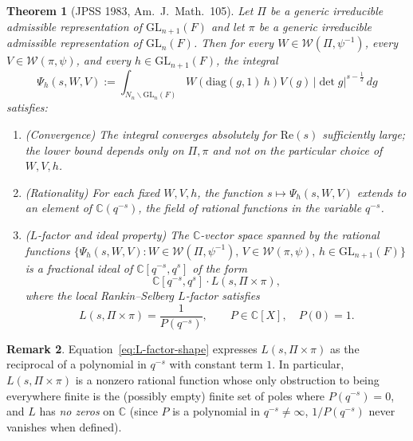 \documentclass[12pt]{article}
\newtheorem{theorem}{Theorem}
\theoremstyle{definition}
\newtheorem{remark}[theorem]{Remark}
\begin{document}
\begin{theorem}[JPSS 1983, Am.\ J.\ Math.\ 105]\label{thm:JPSS-RS}
Let $\Pi$ be a generic irreducible admissible representation of $\mathrm{GL}_{n+1}(F)$ and let $\pi$ be a generic irreducible admissible representation of $\mathrm{GL}_n(F)$. Then for every $W\in\mathcal{W}(\Pi,\psi^{-1})$, every $V\in\mathcal{W}(\pi,\psi)$, and every $h\in\mathrm{GL}_{n+1}(F)$, the integral
\begin{equation}\label{eq:Psi-h}
\Psi_h(s,W,V):=\int_{N_n\backslash\mathrm{GL}_n(F)}W\!\left(\mathrm{diag}(g,1)\,h\right)V(g)\,|\det g|^{s-\tfrac12}\,dg
\end{equation}
satisfies:
\begin{enumerate}
\item[\textup{(i)}] (\emph{Convergence}) The integral converges absolutely for $\mathrm{Re}(s)$ sufficiently large; the lower bound depends only on $\Pi,\pi$ and not on the particular choice of $W,V,h$.
\item[\textup{(ii)}] (\emph{Rationality}) For each fixed $W,V,h$, the function $s\mapsto\Psi_h(s,W,V)$ extends to an element of $\mathbb{C}(q^{-s})$, the field of rational functions in the variable $q^{-s}$.
\item[\textup{(iii)}] (\emph{$L$-factor and ideal property}) The $\mathbb{C}$-vector space spanned by the rational functions $\{\Psi_h(s,W,V):W\in\mathcal{W}(\Pi,\psi^{-1}),\,V\in\mathcal{W}(\pi,\psi),\,h\in\mathrm{GL}_{n+1}(F)\}$ is a fractional ideal of $\mathbb{C}[q^{-s},q^s]$ of the form
\begin{equation}\label{eq:fractional-ideal}
\mathbb{C}[q^{-s},q^s]\cdot L(s,\Pi\times\pi),
\end{equation}
where the local Rankin--Selberg $L$-factor satisfies
\begin{equation}\label{eq:L-factor-shape}
L(s,\Pi\times\pi)=\frac{1}{P(q^{-s})},\qquad P\in\mathbb{C}[X],\quad P(0)=1.
\end{equation}
\end{enumerate}
\end{theorem}

\begin{remark}\label{rem:L-no-zeros}
Equation~\eqref{eq:L-factor-shape} expresses $L(s,\Pi\times\pi)$ as the reciprocal of a polynomial in $q^{-s}$ with constant term $1$. In particular, $L(s,\Pi\times\pi)$ is a nonzero rational function whose only obstruction to being everywhere finite is the (possibly empty) finite set of poles where $P(q^{-s})=0$, and $L$ has \emph{no zeros} on $\mathbb{C}$ (since $P$ is a polynomial in $q^{-s}\ne\infty$, $1/P(q^{-s})$ never vanishes when defined).
\end{remark}
\end{document}

